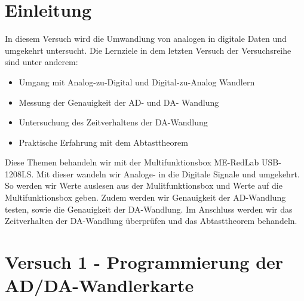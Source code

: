 \documentclass[12pt, oneside, a4paper, \docLanguage]{report}
\begin{document}

\setcounter{section}{0}


\clearpage

%
%


%
%


%
%


%
%




\setcounter{page}{1} 
\pagestyle{default}

%
%
\chapter{Einleitung}
\label{chap:EINL}
In diesem Versuch wird die Umwandlung von analogen in digitale Daten und umgekehrt untersucht.
Die Lernziele in dem letzten Versuch der Versuchsreihe sind unter anderem:
\begin{itemize}
\item Umgang mit Analog-zu-Digital und Digital-zu-Analog Wandlern
\item Messung der Genauigkeit der AD- und DA- Wandlung
\item Untersuchung des Zeitverhaltens der DA-Wandlung
\item Praktische Erfahrung mit dem Abtasttheorem
\newline
\end{itemize}
Diese Themen behandeln wir mit der Multifunktionsbox ME-RedLab USB-1208LS. Mit dieser wandeln wir Analoge- in die Digitale Signale und umgekehrt.
\newline
So werden wir Werte auslesen aus der Mulitfunktionsbox und Werte auf die Multifunktionsbox geben.
Zudem werden wir Genauigkeit der AD-Wandlung testen, sowie die Genauigkeit der DA-Wandlung.
\newline
Im Anschluss werden wir das Zeitverhalten der DA-Wandlung überprüfen und das Abtasttheorem behandeln.
%
%
\chapter{Versuch 1 - Programmierung der AD/DA-Wandlerkarte}
\label{chap:VERSUCH_1}
\end{document}
